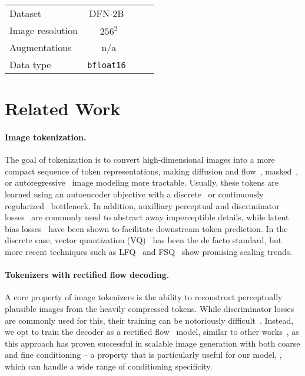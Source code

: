 \begin{table}[h!]
\begin{adjustbox}{max width=\linewidth}
\begin{tabular}{@{}l|cccccc@{}}
    \midrule
    Dataset & \multicolumn{4}{c}{DFN-2B~\cite{dfn_dataset}} \\
    Image resolution & \multicolumn{4}{c}{$256^2$} \\
    Augmentations & \multicolumn{4}{c}{n/a} \\
    Data type & \multicolumn{4}{c}{\texttt{bfloat16}~\cite{Burgess2019Bfloat16}} \\

    \bottomrule
    \end{tabular}
    \end{adjustbox}
\end{table}


\clearpage
\section{Related Work}
\label{sec:app_relatedwork}

\paragraph{Image tokenization.} 
The goal of tokenization is to convert high-dimensional images into a more compact sequence of token representations, making diffusion and flow~\cite{rombach2022high, Podell2023SDXL, Ma2024SiT, Esser2024SD3, Yu2024REPA}, masked~\cite{Chang2022MaskGIT, Chang2023Muse, Li2022MAGE, Lu2022UnifiedIO, Lu2023UnifiedIO2, 4m, 4m21}, or autoregressive~\cite{Chen2020iGPT, Ramesh2021Dalle1, Yu2022Parti, sun2024autoregressive} image modeling more tractable. Usually, these tokens are learned using an autoencoder objective with a discrete~\cite{van2017neural, razavi2019generating} or continuously regularized~\cite{rombach2022high} bottleneck. In addition, auxilliary perceptual and discriminator losses~\cite{esser2021taming, yu2021improvedvqgan} are commonly used to abstract away imperceptible details, while latent bias losses~\cite{Hu2023GAIA1AG} have been shown to facilitate downstream token prediction. In the discrete case, vector quantization (VQ)~\cite{van2017neural} has been the de facto standard, but more recent techniques such as LFQ~\cite{yu2023magvitv2} and FSQ~\cite{mentzer2023fsq} show promising scaling trends. 

\paragraph{Tokenizers with rectified flow decoding.}
A core property of image tokenizers is the ability to reconstruct perceptually plausible images from the heavily compressed tokens. While discriminator losses~\cite{esser2021taming} are commonly used for this, their training can be notoriously difficult~\cite{yu2024titok}. Instead, we opt to train the decoder as a rectified flow~\cite{Liu2022RectifiedFlow} model, similar to other works~\cite{Shi2022DiVAE, 4m, 4m21, Xu2024DisCoDiff, Zhao2024epsilonVAE}, as this approach has proven successful in scalable image generation with both coarse and fine conditioning -- a property that is particularly useful for our model, \ours, which can handle a wide range of conditioning specificity.

